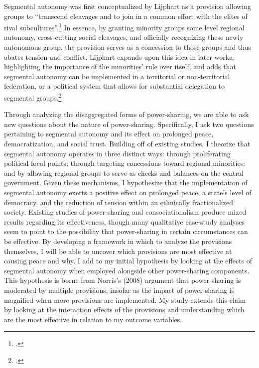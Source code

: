 \documentclass[12pt]{article}
\begin{document}
Segmental autonomy was first conceptualized by Lijphart as a provision allowing groups to ``transcend cleavages and to join in a common effort with the elites of rival subcultures''.\footcite[216]{lijphart_consociational_1969} In essence, by granting minority groups some level regional autonomy, cross-cutting social cleavages, and officially recognizing these newly autonomous group, the provision serves as a concession to those groups and thus abates tension and conflict. Lijphart expands upon this idea in later works, highlighting the importance of the minorities’ rule over itself, and adds that segmental autonomy can be implemented in a territorial or non-territorial federation, or a political system that allows for substantial delegation to segmental groups.\footcite{lijphart_consociational_1977, lijphart_non-majoritarian_1985} 

Through analyzing the disaggregated forms of power-sharing, we are able to ask new questions about the nature of power-sharing. Specifically, I ask two questions pertaining to segmental autonomy and its effect on prolonged peace, democratization, and social trust. Building off of existing studies, I theorize that segmental autonomy operates in three distinct ways: through proliferating political focal points; through targeting concessions toward regional minorities; and by allowing regional groups to serve as checks and balances on the central government. Given these mechanisms, I hypothesize that the implementation of segmental autonomy exerts a positive effect on prolonged peace, a state’s level of democracy, and the reduction of tension within an ethnically fractionalized society. Existing studies of power-sharing and consociationalism produce mixed results regarding its effectiveness, though many qualitative case-study analyses seem to point to the possibility that power-sharing in certain circumstances can be effective. By developing a framework in which to analyze the provisions themselves, I will be able to uncover which provisions are most effective at causing peace and why. I add to my initial hypothesis by looking at the effects of segmental autonomy when employed alongside other power-sharing components. This hypothesis is borne from Norris’s (2008) argument that power-sharing is moderated by multiple provisions, insofar as the impact of power-sharing is magnified when more provisions are implemented. My study extends this claim by looking at the interaction effects of the provisions and understanding which are the most effective in relation to my outcome variables.
\end{document}
